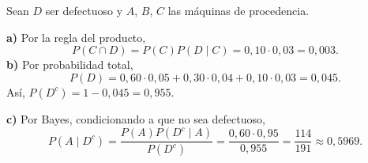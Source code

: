 Sean $D$ ser defectuoso y $A$, $B$, $C$ las máquinas de procedencia.

\textbf{a)} Por la regla del producto,
\[
 P(C\cap D)=P(C)P(D\mid C)=0{,}10\cdot0{,}03=\boxed{0{,}003}.
\]
\textbf{b)} Por probabilidad total,
\[
 P(D)=0{,}60\cdot0{,}05+0{,}30\cdot0{,}04+0{,}10\cdot0{,}03=0{,}045.
\]
Así, $P(D^c)=1-0{,}045=\boxed{0{,}955}$.

\textbf{c)} Por Bayes, condicionando a que no sea defectuoso,
\[
 P(A\mid D^c)=\frac{P(A)P(D^c\mid A)}{P(D^c)}
 =\frac{0{,}60\cdot0{,}95}{0{,}955}
 =\boxed{\frac{114}{191}}\approx0{,}5969.
\]
